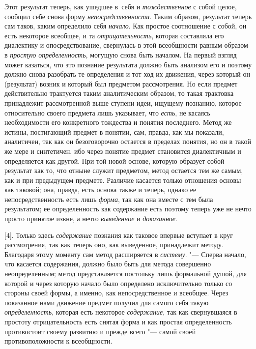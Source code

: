 Этот результат теперь, как ушедшее в~себя и {\em тождественное} с
собой целое, сообщил себе снова форму {\em непосредственности}.
Таким образом, результат теперь сам таков, каким определило
себя {\em начало}. Как
простое соотношение с собой, он есть некоторое всеобщее, и та
{\em отрицательность},
которая составляла его диалектику и опосредствование,
свернулась в этой всеобщности равным образом в
{\em простую определенность},
могущую снова быть началом. На первый взгляд может казаться,
что это познание результата должно быть анализом его и поэтому должно снова
разобрать те определения и тот ход их движения, через который он
(результат) возник и который был предметом рассмотрения. Но если предмет
действительно трактуется таким аналитическим образом, то такая трактовка
принадлежит рассмотренной выше ступени идеи, ищущему познанию, которое
относительно своего предмета лишь указывает, что {\em есть}, не касаясь
необходимости его конкретного тождества и понятия последнего. Метод же
истины, постигающий предмет в понятии, сам, правда, как мы показали,
аналитичен, так как он безоговорочно остается в пределах понятия, но он в
такой же мере и синтетичен, ибо через понятие предмет становится
диалектичным и определяется как другой. При той новой основе, которую
образует собой результат как то, что отныне служит предметом, метод
остается тем же самым, как и при предыдущем предмете. Различие касается
только отношения основы как таковой; она, правда, есть основа также и
теперь, однако ее непосредственность есть лишь {\em форма}, так как она
вместе с тем была результатом; ее определенность как содержание есть
поэтому теперь уже не нечто просто принятое извне, а нечто
{\em выведенное} и {\em доказанное}.

[4]. Только здесь {\em содержание} познания
как таковое впервые вступает в круг рассмотрения, так как теперь оно, как
выведенное, принадлежит методу. Благодаря этому моменту сам метод
расширяется в {\em систему}. "---
Сперва начало, что касается содержания, должно было быть для
метода совершенно неопределенным; метод представляется постольку лишь
формальной душой, для которой и через которую начало было определено
исключительно только со стороны своей формы, а именно, как непосредственное
и всеобщее. Через показанное нами движение предмет получил для самого себя
такую {\em определенность}, которая есть некоторое {\em содержание}, так как
свернувшаяся в простоту отрицательность есть снятая форма и как простая
определенность противостоит своему развитию и прежде всего
"--- самой своей противоположности к всеобщности.

